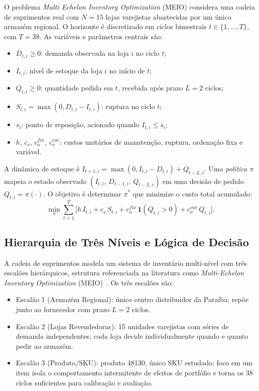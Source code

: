 \documentclass[a4paper,11pt]{article}
\begin{document}
O problema \textit{Multi Echelon Inventory Optimization} (MEIO)
considera uma cadeia de suprimentos real com $N = 15$ lojas
varejistas abastecidas por um único armazém regional. O horizonte é
discretizado em ciclos bimestrais $t \in \{1, \ldots, T\}$, com
$T = 38$. As variáveis e parâmetros centrais são:

\begin{itemize}
  \item $D_{t,i} \geq 0$: demanda observada na loja $i$ no ciclo $t$;
  \item $I_{t,i}$: nível de estoque da loja $i$ no início de $t$;
  \item $Q_{t,i} \geq 0$: quantidade pedida em $t$, recebida após
    prazo $L = 2$ ciclos;
  \item $S_{t,i} = \max(0, D_{t,i} - I_{t,i})$: ruptura no ciclo $t$;
  \item $s_i$: ponto de reposição, acionado quando $I_{t,i} \leq s_i$;
  \item $h$, $c_s$, $c_o^{fix}$, $c_o^{var}$: custos unitários de
    manutenção, ruptura, ordenação fixa e variável.
\end{itemize}

A dinâmica de estoque é $I_{t+1,i} = \max(0, I_{t,i} - D_{t,i}) +
Q_{t-L,i}$. Uma \emph{política} $\pi$ mapeia o estado observado
$(I_{t,i},\, D_{t-1,i},\, Q_{t-L,i})$ em uma decisão de pedido
$Q_{t,i} = \pi(\cdot)$. O objetivo é determinar $\pi^*$ que minimize
o custo total acumulado:
\begin{equation}
  \min_\pi \sum_{t=1}^{T} \bigl[
    h\, I_{t,i} + c_s\, S_{t,i}
    + c_o^{fix}\,\mathbf{1}(Q_{t,i}>0)
    + c_o^{var}\, Q_{t,i}
  \bigr].
  \label{eq:obj}
\end{equation}

\subsection{Hierarquia de Três Níveis e Lógica de Decisão}

A cadeia de suprimentos modela um sistema de inventário multi-nível
com três escalões hierárquicos, estrutura referenciada na literatura
como \textit{Multi-Echelon Inventory Optimization}
(MEIO)~\citep{axsater:2006,clark:1960}. Os três escalões são:

\begin{itemize}
  \item Escalão 1 (Armazém Regional): único centro distribuidor da
    Paraíba; repõe junto ao fornecedor com prazo $L = 2$ ciclos.
  \item Escalão 2 (Lojas Revendedoras): 15 unidades varejistas com
    séries de demanda independentes; cada loja decide individualmente
    quando e quanto pedir ao armazém.
  \item Escalão 3 (Produto/SKU): produto 48130, único SKU estudado;
    foco em um item isola o comportamento intermitente de efeitos de
    portfólio e torna os 38 ciclos suficientes para calibração e avaliação.
\end{itemize}
\end{document}
